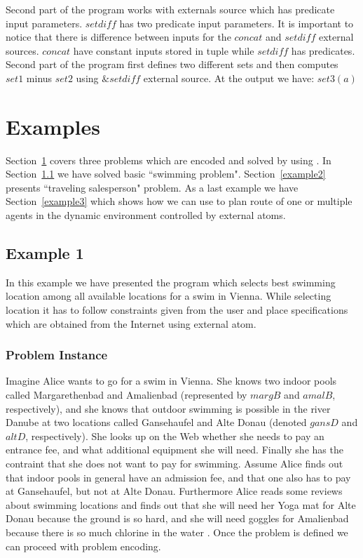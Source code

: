 \documentclass[14pt,a4paper, titlepage]{article}
\begin{document}
Second part of the program works with externals source which has predicate input parameters. $\mathit{setdiff}$ has two predicate input parameters. It is important to notice that there is difference between inputs for the $\mathit{concat}$ and $\mathit{setdiff}$ external sources. $\mathit{concat}$ have constant inputs stored in tuple while $\mathit{setdiff}$ has predicates. Second part of the program first defines two different sets and then computes $\mathit{set1}$ minus $\mathit{set2}$ using $\mathit{\&setdiff}$ external source. At the output we have: $\mathit{set3}(a)$ 

\section{Examples}
\label{sec:examples}
Section~\ref{sec:examples} covers three problems which are encoded and solved by using \dlvhex{}. In Section~\ref{example1} we have solved basic ``swimming problem". Section~\ref{example2} presents ``traveling salesperson" problem. As a last example we have Section~\ref{example3} which shows how we can use \dlvhex{} to plan route of one or multiple agents in the dynamic environment controlled by external atoms.

\subsection{Example 1}
\label{example1}
In this example we have presented the program which selects best swimming location among all available locations for a swim in Vienna. While selecting location it has to follow constraints given from the user and place specifications which are obtained from the Internet using external atom.
 
\subsubsection{Problem Instance}
Imagine Alice wants to go for a swim in Vienna. She knows two indoor pools called Margarethenbad and Amalienbad (represented by $\mathit{margB}$ and $\mathit{amalB}$, respectively), and she knows that outdoor swimming is possible in the river Danube at two locations called Gansehaufel and Alte Donau (denoted $\mathit{gansD}$ and $\mathit{altD}$, respectively). She looks up on the Web whether she needs to pay an entrance fee, and what additional equipment she will need. Finally she has the contraint that she does not want to pay for swimming. Assume Alice finds out that indoor pools in general have an admission fee, and that one also
has to pay at Gansehaufel, but not at Alte Donau. Furthermore Alice reads some reviews about swimming locations and finds out that she will need her Yoga mat for Alte Donau because the ground is so hard, and she will need goggles for Amalienbad because there is so much chlorine in the water \cite{swim}. Once the problem is defined we can proceed with problem encoding.    
\end{document}
